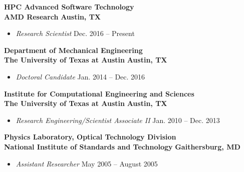 \textbf{HPC Advanced Software Technology}\\
\textbf{AMD Research} \hfill \textbf{Austin, TX}
%
\begin{itemize}
\item[] \textit{Research Scientist} \hfill
	Dec. 2016 -- Present

\end{itemize}

\blankline


\textbf{Department of Mechanical Engineering}\\
\textbf{The University of Texas at Austin} \hfill \textbf{Austin, TX}
%
\begin{itemize}
\item[] \textit{Doctoral Candidate} \hfill
	Jan. 2014 -- Dec. 2016
\end{itemize}

\blankline

\textbf{Institute for Computational Engineering and Sciences}\\
\textbf{The University of Texas at Austin} \hfill \textbf{Austin, TX}
%
\begin{itemize}
\item[] \textit{Research Engineering/Scientist Associate II} \hfill
	Jan. 2010 -- Dec. 2013
\end{itemize}

\blankline

\textbf{Physics Laboratory, Optical Technology Division}\\
\textbf{National Institute of Standards and Technology} \hfill \textbf{Gaithersburg, MD}
%
\begin{itemize}
\item[] \textit{Assistant Researcher} \hfill
	May 2005 -- August 2005
\end{itemize}